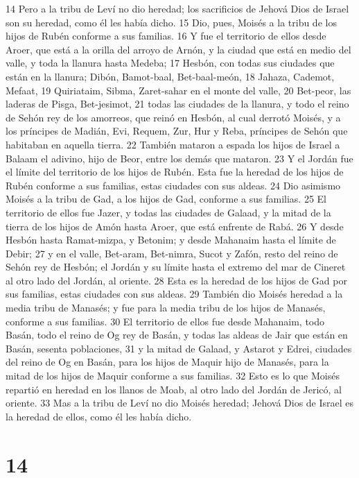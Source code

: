 14 Pero a la tribu de Leví no dio heredad; los sacrificios de Jehová Dios de Israel son su heredad, como él les había dicho. 
15 Dio, pues, Moisés a la tribu de los hijos de Rubén conforme a sus familias.
16 Y fue el territorio de ellos desde Aroer, que está a la orilla del arroyo de Arnón, y la ciudad que está en medio del valle, y toda la llanura hasta Medeba;
17 Hesbón, con todas sus ciudades que están en la llanura; Dibón, Bamot-baal, Bet-baal-meón,
18 Jahaza, Cademot, Mefaat,
19 Quiriataim, Sibma, Zaret-sahar en el monte del valle,
20 Bet-peor, las laderas de Pisga, Bet-jesimot,
21 todas las ciudades de la llanura, y todo el reino de Sehón rey de los amorreos, que reinó en Hesbón, al cual derrotó Moisés, y a los príncipes de Madián, Evi, Requem, Zur, Hur y Reba, príncipes de Sehón que habitaban en aquella tierra.
22 También mataron a espada los hijos de Israel a Balaam el adivino, hijo de Beor, entre los demás que mataron.
23 Y el Jordán fue el límite del territorio de los hijos de Rubén. Esta fue la heredad de los hijos de Rubén conforme a sus familias, estas ciudades con sus aldeas.
24 Dio asimismo Moisés a la tribu de Gad, a los hijos de Gad, conforme a sus familias.
25 El territorio de ellos fue Jazer, y todas las ciudades de Galaad, y la mitad de la tierra de los hijos de Amón hasta Aroer, que está enfrente de Rabá.
26 Y desde Hesbón hasta Ramat-mizpa, y Betonim; y desde Mahanaim hasta el límite de Debir;
27 y en el valle, Bet-aram, Bet-nimra, Sucot y Zafón, resto del reino de Sehón rey de Hesbón; el Jordán y su límite hasta el extremo del mar de Cineret al otro lado del Jordán, al oriente.
28 Esta es la heredad de los hijos de Gad por sus familias, estas ciudades con sus aldeas.
29 También dio Moisés heredad a la media tribu de Manasés; y fue para la media tribu de los hijos de Manasés, conforme a sus familias.
30 El territorio de ellos fue desde Mahanaim, todo Basán, todo el reino de Og rey de Basán, y todas las aldeas de Jair que están en Basán, sesenta poblaciones,
31 y la mitad de Galaad, y Astarot y Edrei, ciudades del reino de Og en Basán, para los hijos de Maquir hijo de Manasés, para la mitad de los hijos de Maquir conforme a sus familias.
32 Esto es lo que Moisés repartió en heredad en los llanos de Moab, al otro lado del Jordán de Jericó, al oriente.
33 Mas a la tribu de Leví no dio Moisés heredad; Jehová Dios de Israel es la heredad de ellos, como él les había dicho. 

\chapter{14}

